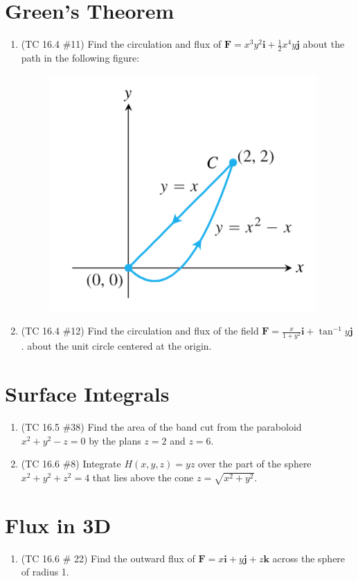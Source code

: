 \documentclass[letterpaper, 11pt]{article}
\begin{document}
\section{Green's Theorem}
\begin{enumerate}
\item (TC 16.4 \#11) Find the circulation and flux of $\bm{F} = x^3 y^2 \bm{i} + \frac{1}{2} x^4 y \bm{j}$ about the path in the following figure:
\begin{figure}[H]
\centering \includegraphics[width=0.2\columnwidth]{finalReviewImgs/TC164_11.png}
\end{figure}

\item (TC 16.4 \#12) Find the circulation and flux of the field $\bm{F} = \frac{x}{1 + y^2} \bm{i} + \tan^{-1}y \bm{j}$. about the unit circle centered at the origin. 



\end{enumerate}

\section{Surface Integrals}
\begin{enumerate}
\item (TC 16.5 \#38) Find the area of the band cut from the paraboloid $x^2 + y^2 - z = 0$ by the plans $z = 2$ and $z = 6$. 


\item (TC 16.6 \#8) Integrate $H(x,y,z) = yz$ over the part of the sphere $x^2 + y^2 + z^2 = 4$ that lies above the cone $z = \sqrt{x^2 + y^2}$. 




\end{enumerate}

\section{Flux in 3D}
\begin{enumerate}
\item (TC 16.6 \# 22) Find the outward flux of $\bm{F} = x \bm{i} + y \bm{j} + z \bm{k}$ across the sphere of radius 1. 



\end{enumerate}
\end{document}
